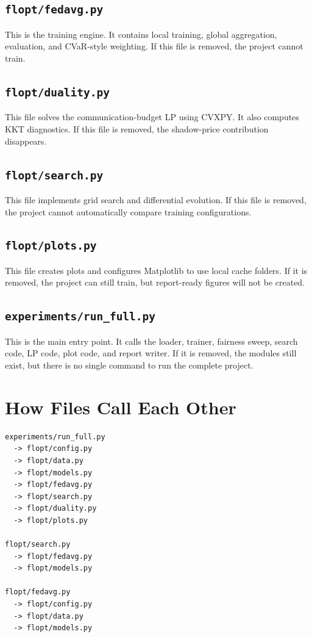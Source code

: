 \documentclass{article}
\begin{document}
\subsection{\texttt{flopt/fedavg.py}}
This is the training engine. It contains local training, global aggregation, evaluation, and CVaR-style weighting. If this file is removed, the project cannot train.

\subsection{\texttt{flopt/duality.py}}
This file solves the communication-budget LP using CVXPY. It also computes KKT diagnostics. If this file is removed, the shadow-price contribution disappears.

\subsection{\texttt{flopt/search.py}}
This file implements grid search and differential evolution. If this file is removed, the project cannot automatically compare training configurations.

\subsection{\texttt{flopt/plots.py}}
This file creates plots and configures Matplotlib to use local cache folders. If it is removed, the project can still train, but report-ready figures will not be created.

\subsection{\texttt{experiments/run\_full.py}}
This is the main entry point. It calls the loader, trainer, fairness sweep, search code, LP code, plot code, and report writer. If it is removed, the modules still exist, but there is no single command to run the complete project.

\section{How Files Call Each Other}
\begin{lstlisting}[style=textstyle]
experiments/run_full.py
  -> flopt/config.py
  -> flopt/data.py
  -> flopt/models.py
  -> flopt/fedavg.py
  -> flopt/search.py
  -> flopt/duality.py
  -> flopt/plots.py

flopt/search.py
  -> flopt/fedavg.py
  -> flopt/models.py

flopt/fedavg.py
  -> flopt/config.py
  -> flopt/data.py
  -> flopt/models.py
\end{lstlisting}
\end{document}
